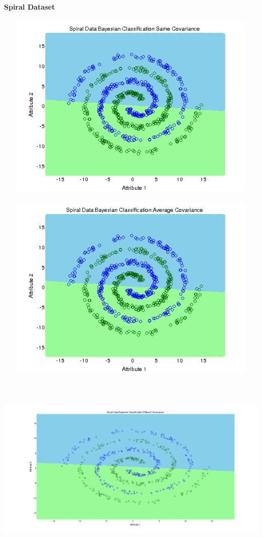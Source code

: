 \documentclass[a4paper]{article}
\begin{document}
			\paragraph{Spiral Dataset}
			\centerline{\includegraphics[width=160mm,height=90mm]{plots/bayes/nls/spiral/same_cov.png}}
 			\centerline{\includegraphics[width=160mm,height=90mm]{plots/bayes/nls/spiral/avg_cov.png}}
 			\centerline{\includegraphics[width=160mm,height=90mm]{plots/bayes/nls/spiral/diff_cov.png}}
\end{document}
